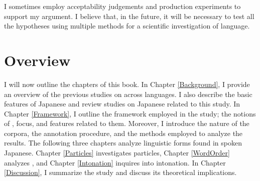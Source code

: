 I sometimes employ acceptability judgements and production experiments
to support my argument.
I believe that, in the future,
it will be necessary to test all the hypotheses using multiple methods
for a scientific investigation of language.


\section{Overview}\label{IntroOverview}

I will now outline the chapters of this book.
In Chapter \ref{Background},
I provide an overview of the previous studies on  across languages.
I also describe the basic features of Japanese and review studies on Japanese related to this study.
In Chapter \ref{Framework},
I outline the framework employed in the study;
the notions of , focus, and features related to them.
Moreover, I introduce the nature of the corpora,
the annotation procedure, and the methods employed to analyze the results.
The following three chapters analyze linguistic forms found in spoken Japanese.
Chapter \ref{Particles} investigates particles,
Chapter \ref{WordOrder} analyzes , and
Chapter \ref{Intonation} inquires into intonation.
In Chapter \ref{Discussion},
I summarize the study and discuss its theoretical implications.

















